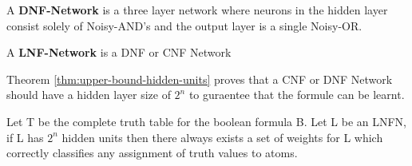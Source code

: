 \theoremstyle{definition}
\begin{definition} \label{def:dnf-network}
A \textbf{DNF-Network} is a three layer network where neurons in the hidden layer consist solely of Noisy-AND's and the output layer is a single Noisy-OR. 
\end{definition}

\theoremstyle{definition}
\begin{definition} \label{def:lnfn}
A \textbf{LNF-Network} is a DNF or CNF Network
\end{definition}

Theorem \ref{thm:upper-bound-hidden-units} proves that a CNF or DNF Network should have a hidden layer size of $2^n$ to guraentee that the formule can be learnt.

\begin{theorem}
Let T be the complete truth table for the boolean formula B. Let L be an LNFN, if L has $2^n$ hidden units then there always exists a set of weights for L which correctly classifies any assignment of truth values to atoms.
\label{thm:upper-bound-hidden-units}
\end{theorem}

